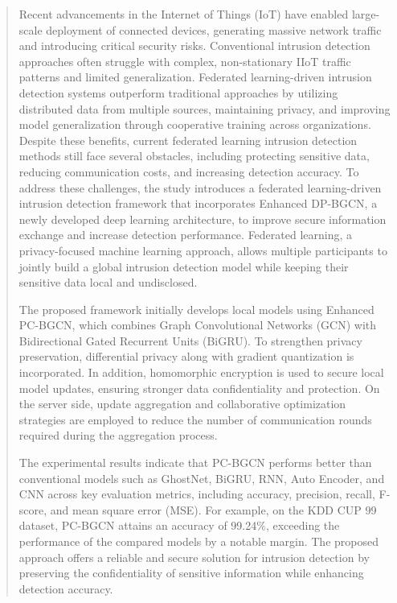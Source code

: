 \documentclass[a4paper,fleqn]{cas-sc}
\begin{document}
\begin{abstract}
Recent advancements in the Internet of Things (IoT) have enabled large-scale deployment of connected devices, generating massive network traffic and introducing critical security risks. Conventional intrusion detection approaches often struggle with complex, non-stationary IIoT traffic patterns and limited generalization. Federated learning-driven intrusion detection systems outperform traditional approaches by utilizing distributed data from multiple sources, maintaining privacy, and improving model generalization through cooperative training across organizations. Despite these benefits, current federated learning intrusion detection methods still face several obstacles, including protecting sensitive data, reducing communication costs, and increasing detection accuracy. To address these challenges, the study introduces a federated learning-driven intrusion detection framework that incorporates Enhanced DP-BGCN, a newly developed deep learning architecture, to improve secure information exchange and increase detection performance. Federated learning, a privacy-focused machine learning approach, allows multiple participants to jointly build a global intrusion detection model while keeping their sensitive data local and undisclosed.

The proposed framework initially develops local models using Enhanced PC-BGCN, which combines Graph Convolutional Networks (GCN) with Bidirectional Gated Recurrent Units (BiGRU). To strengthen privacy preservation, differential privacy along with gradient quantization is incorporated. In addition, homomorphic encryption is used to secure local model updates, ensuring stronger data confidentiality and protection. On the server side, update aggregation and collaborative optimization strategies are employed to reduce the number of communication rounds required during the aggregation process.

The experimental results indicate that PC-BGCN performs better than conventional models such as GhostNet, BiGRU, RNN, Auto Encoder, and CNN across key evaluation metrics, including accuracy, precision, recall, F-score, and mean square error (MSE). For example, on the KDD CUP 99 dataset, PC-BGCN attains an accuracy of 99.24\%, exceeding the performance of the compared models by a notable margin. The proposed approach offers a reliable and secure solution for intrusion detection by preserving the confidentiality of sensitive information while enhancing detection accuracy.
\end{abstract}
\end{document}
